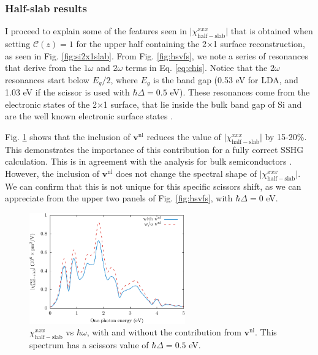 
\subsubsection{Half-slab results}

I proceed to explain some of the features seen in
$\vert\chi^{xxx}_{\mathrm{half-slab}}\vert$ that is obtained when setting
$\mathbf{\mathcal{C}}(z) = 1$ for the upper half containing the 2$\times$1
surface reconstruction, as seen in Fig. \ref{fig:si2x1slab}. From Fig.
\ref{fig:hsvfs}, we note a series of resonances that derive from the $1\omega$
and $2\omega$ terms in Eq. \eqref{eq:chis}. Notice that the $2\omega$ resonances
start below $E_{g}/2$, where $E_{g}$ is the band gap (0.53 eV for LDA, and 1.03
eV if the scissor is used with $\hbar\Delta=0.5$ eV). These resonances come from
the electronic states of the 2$\times$1 surface, that lie inside the bulk band
gap of Si and are the well known electronic surface states \cite{rohlfingPRB95}.

Fig. \ref{fig:vnl} shows that the inclusion of $\mathbf{v}^\mathrm{nl}$ reduces
the value of $\vert\chi^{xxx}_{\mathrm{half-slab}}\vert$ by 15-20\%. This
demonstrates the importance of this contribution for a fully correct SSHG
calculation. This is in agreement with the analysis for bulk semiconductors
\cite{luppiPRB08}. However, the inclusion of $\mathbf{v}^\mathrm{nl}$ does not
change the spectral shape of $\vert\chi^{xxx}_{\mathrm{half-slab}}\vert$. We can
confirm that this is not unique for this specific scissors shift, as we can
appreciate from the upper two panels of Fig. \ref{fig:hsvfs}, with $\hbar\Delta
= 0$ eV.

\begin{figure}[H]
\centering 
\includegraphics[width=0.6\textwidth]{content/figures/fig-Si2x1-vnl}
\caption{$\chi^{xxx}_{\mathrm{half-slab}}$ vs $\hbar\omega$, with and without
the contribution from $\mathbf{v}^\mathrm{nl}$. This spectrum has a scissors
value of $\hbar\Delta=0.5$ eV.}
\label{fig:vnl}
\end{figure}

